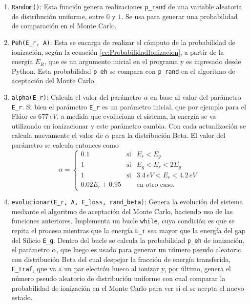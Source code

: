 \begin{enumerate}[label=\arabic*., listparindent=1.5em]
    \item \verb|Random()|: Esta función genera realizaciones \verb|p_rand| de una variable aleatoria de distribución uniforme, entre $0$ y $1$. Se usa para generar una probabilidad de comparación en el Monte Carlo.
    \item \verb|Peh(E_r, A)|: Esta se encarga de realizar el cómputo de la probabilidad de ionización, según la ecuación \eqref{ec:ProbabilidadIonizacion}, a partir de la energía $E_{R}$, que es un argumento inicial en el programa y es ingresado desde Python. Esta probabilidad \verb|p_eh| se compara con \verb|p_rand| en el algoritmo de aceptación del Monte Carlo.
    \item \verb|alpha(E_r)|: Calcula el valor del parámetro $\alpha$ en base al valor del parámetro \verb|E_r|. Si bien el parámetro \verb|E_r| es un parámetro inicial, que por ejemplo para el Flúor es $677\,\si{eV}$, a medida que evoluciona el sistema, la energía se va utilizando en ionizacionar y este parámetro cambia. Con cada actualización se calcula nuevamente el valor de $\alpha$ para la distribución Beta. El valor del parámetro se calcula entonces como
    \begin{equation*}
        \alpha =
        \left\{ \begin{array}{lcc}
             0.1 & \mbox{si} & E_{r} < E_{g}\\
             1 & \mbox{si} & E_{g} < E_{r} < 2E_{g}\\
             1 & \mbox{si} & 3.4\,\si{eV} < E_{r} < 4.2\,\si{eV}\\
             0.02E_{r} + 0.95 & & \mbox{en otro caso.}
             \end{array}
        \right.
    \end{equation*}
    \item \verb|evolucionar(E_r, A, E_loss, rand_beta)|: Genera la evolución del sistema mediante el algoritmo de aceptación del Monte Carlo, haciendo uso de las funciones anteriores. Implementa un bucle \verb|while|, cuya condición es que se repita el proceso mientras que la energía \verb|E_r| sea mayor que la energía del gap del Silicio \verb|E_g|. Dentro del bucle se calcula la probabilidad \verb|p_eh| de ionización, el parámetro $\alpha$, que luego es usado para generar un número pseudo aleatorio con distribución Beta del cual despejar la fracción de energía transferida, \verb|E_traf|, que va a un par electrón hueco al ionizar y, por último, genera el número pseudo aleatorio de distribución uniforme con cual comparar la probabilidad de ionización en el Monte Carlo para ver si el se acepta el nuevo estado.\\

\end{enumerate}
